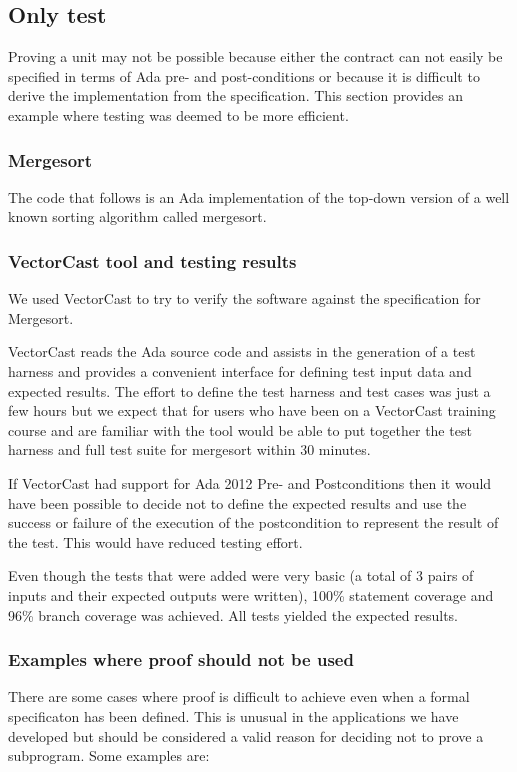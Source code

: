 \documentclass{llncs}
\newcommand{\vectorcast}{VectorCast\xspace}
\begin{document}
\subsection{Only test}
Proving a unit may not be possible because either the contract can not
easily be specified in terms of Ada pre- and post-conditions or 
because it is difficult to derive the implementation from the 
specification.  This section provides an example where
testing was deemed to be more efficient.

\subsubsection{Mergesort}
The code that follows is an Ada implementation of the top-down version
of a well known sorting algorithm called mergesort.
 

\subsubsection{\vectorcast tool and testing results}
We used \vectorcast to try to verify the software against the 
specification for Mergesort.

\vectorcast reads the Ada source code and
assists in the generation of a test harness and provides a convenient
interface for defining test input data and expected results.
The effort to define the test harness and test cases was just a few
hours but we expect that for users who have been on a \vectorcast
training course and are familiar with the tool 
would be able to put together
the test harness and full test suite for mergesort within 30 minutes.

If \vectorcast had support for Ada 2012 Pre- and Postconditions then 
it would have been possible to decide not to define the expected results
and use the success or failure of the execution of the postcondition
to represent the result of the test. This would have reduced 
testing effort.

Even though the tests that were added were very basic (a total of 3
pairs of inputs and their expected outputs were written), 100\%
statement coverage and 96\% branch coverage was achieved. All tests
yielded the expected results.


\subsubsection{Examples where proof should not be used}
There are some cases where proof is difficult to achieve even when
a formal specificaton has been defined. This is unusual in the 
applications we have developed but should be considered a valid
reason for deciding not to prove a subprogram. Some examples are:
\end{document}

